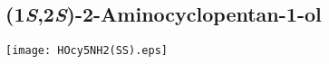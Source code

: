 %
%
%
%
%

\subsection{(1\textit{S},2\textit{S})\hyp{}2\hyp{}Aminocyclopentan\hyp{}1\hyp{}ol }


\begin{scheme}[H]
	\begin{center}
		\texttt{[image: HOcy5NH2(SS).eps]}
	\end{center}
\end{scheme}

